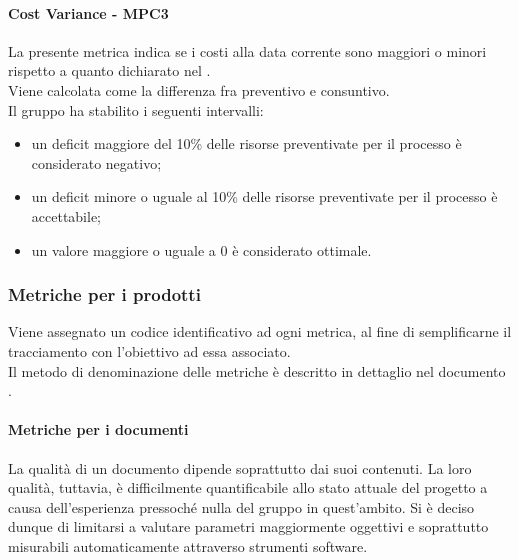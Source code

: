 \documentclass[PianoDiQualifica.tex]{subfiles}
\begin{document}
			\hypertarget{Cost_m}{\paragraph{Cost Variance - MPC3}}
			La presente metrica indica se i costi alla data corrente sono maggiori o minori rispetto a quanto dichiarato nel \PPdocRR{}. \\
			Viene calcolata come la differenza fra preventivo e consuntivo. \\
			Il gruppo ha stabilito i seguenti intervalli:
			\begin{itemize}
				\item un deficit maggiore del 10\% delle risorse preventivate per il processo è considerato negativo;
				\item un deficit minore o uguale al 10\% delle risorse preventivate per il processo è accettabile;
				\item un valore maggiore o uguale a 0 è considerato ottimale.
			\end{itemize}
			
		\subsubsection{Metriche per i prodotti}
		Viene assegnato un codice identificativo ad ogni metrica, al fine di semplificarne il tracciamento con l'obiettivo ad essa associato. \\
		Il metodo di denominazione delle metriche è descritto in dettaglio nel documento \NPdocRR{}.
		
			\paragraph{Metriche per i documenti}
			La qualità di un documento dipende soprattutto dai suoi contenuti. La loro qualità, tuttavia, è difficilmente quantificabile allo stato attuale del progetto a causa
			dell’esperienza pressoché nulla del gruppo in quest’ambito. Si è deciso dunque di limitarsi a valutare parametri maggiormente oggettivi e soprattutto misurabili automaticamente
			attraverso strumenti software.
			
\end{document}
